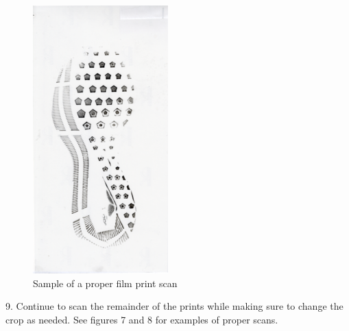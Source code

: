 \begin{figure}[!htp]
\centering
\includegraphics[scale=2]{New_Film}
\caption{Sample of a proper film print scan}
\label{Image 8}
\end{figure}

9. Continue to scan the remainder of the prints while making sure to change the crop as needed. See figures 7 and 8 for examples of proper scans. 



